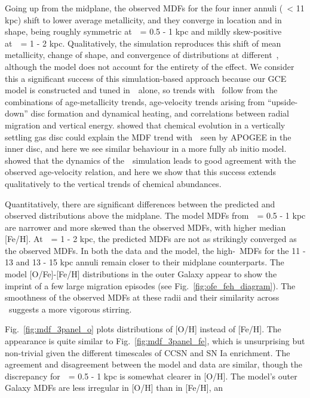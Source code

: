 \documentclass[draft2.tex]{subfiles}
\begin{document}
Going up from the midplane, the observed MDFs for the four inner annuli 
(\rgal~< 11 kpc) shift to lower average metallicity, and they converge in 
location and in shape, being roughly symmetric at~\absz~= 0.5 - 1 kpc and 
mildly skew-positive at~\absz~= 1 - 2 kpc. 
Qualitatively, the simulation reproduces this shift of mean metallicity, change 
of shape, and convergence of distributions at different~\rgal, although the 
model does not account for the entirety of the effect. 
We consider this a significant success of this simulation-based approach 
because our GCE model is constructed and tuned in~\rgal~alone, so trends with 
\absz~follow from the combinations of age-metallicity trends, age-velocity 
trends arising from ``upside-down'' disc formation and dynamical heating, and 
correlations between radial migration and vertical energy. 
\citet{Freudenburg2017} showed that chemical evolution in a vertically settling 
gas disc could explain the MDF trend with~\absz~seen by APOGEE in the inner 
disc, and here we see similar behaviour in a more fully ab initio model. 
\citet{Bird2020} showed that the dynamics of the~\hsim~simulation leads to good 
agreement with the observed age-velocity relation, and here we show that 
this success extends qualitatively to the vertical trends of chemical 
abundances. 
\par 
Quantitatively, there are significant differences between the predicted and 
observed distributions above the midplane. 
The model MDFs from~\absz~= 0.5 - 1 kpc are narrower and more skewed than the 
observed MDFs, with higher median [Fe/H]. 
At~\absz~= 1 - 2 kpc, the predicted MDFs are not as strikingly converged as the 
observed MDFs. 
In both the data and the model, the high-\absz~MDFs for the 11 - 13 and 13 - 15 
kpc annuli remain closer to their midplane counterparts. 
The model [O/Fe]-[Fe/H] distributions in the outer Galaxy appear to show the 
imprint of a few large migration episodes (see Fig.~\ref{fig:ofe_feh_diagram}). 
The smoothness of the observed MDFs at these radii and their similarity across 
\absz~suggests a more vigorous stirring. 
\par 
Fig.~\ref{fig:mdf_3panel_o} plots distributions of [O/H] instead of [Fe/H]. 
The appearance is quite similar to Fig.~\ref{fig:mdf_3panel_fe}, which is 
unsurprising but non-trivial given the different timescales of CCSN and SN Ia 
enrichment. 
The agreement and disagreement between the model and data are similar, though 
the discrepancy for~\absz~= 0.5 - 1 kpc is somewhat clearer in [O/H]. 
The model's outer Galaxy MDFs are less irregular in [O/H] than in [Fe/H], an 
\end{document}
